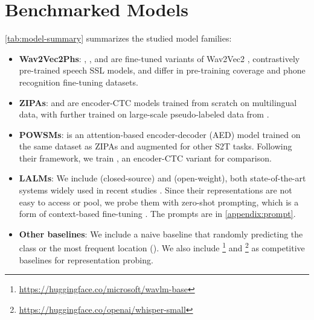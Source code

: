 \section{Benchmarked Models}
\label{ss:exp_models}

\autoref{tab:model-summary} summarizes the studied model families:
\begin{itemize}[nosep]
\item \textbf{Wav2Vec2Phs}: 
\mipa, \lvsixty, and \xlsrf are fine-tuned variants of Wav2Vec2 \cite{baevski2020wav2vec}, contrastively pre-trained speech SSL models, and differ in pre-training coverage and phone recognition fine-tuning datasets.
\item \textbf{ZIPAs}:
\zipactc and \zipactcns are encoder-CTC models trained from scratch on multilingual data, with \zipactcns further trained on large-scale pseudo-labeled data from \zipactc.
\item \textbf{POWSMs}:
\powsm is an attention-based encoder-decoder (AED) model trained on the same dataset as ZIPAs and augmented for other S2T tasks. Following their framework, we train \powsmctc, an encoder-CTC variant for comparison.
\item \textbf{LALMs}:
We include \gemini (closed-source) and \qweni (open-weight), both state-of-the-art systems widely used in recent studies \cite{lee2025ahelm}. 
Since their representations are not easy to access or pool, we probe them with zero-shot prompting, which is a form of context-based fine-tuning \cite{petrov2023prompting}.
The prompts are in \autoref{appendix:prompt}.
\item \textbf{Other baselines}:
We include a naive baseline that randomly predicting the class or the most frequent location (\geov). 
We also include \wavlm\footnote{\url{https://huggingface.co/microsoft/wavlm-base}}\cite{chen2022wavlm} and \whisper\footnote{\url{https://huggingface.co/openai/whisper-small}}\cite{radford2023robust} as competitive baselines for representation probing.
\end{itemize}
